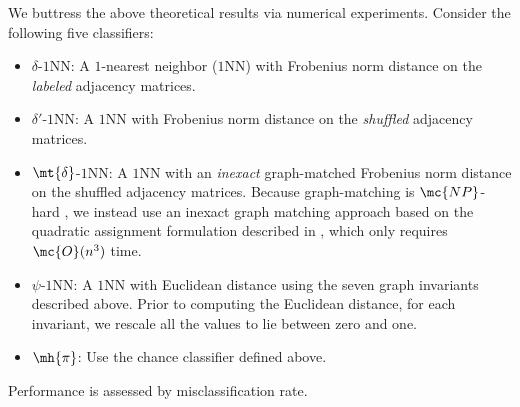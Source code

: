 \documentclass[10pt,journal,cspaper,compsoc]{IEEEtran}
\begin{document}
We buttress the above theoretical results via numerical experiments.  Consider the following five classifiers:
\begin{itemize}
	\item {$\delta$-$1$NN:}  A $1$-nearest neighbor ($1$NN) with Frobenius norm distance on the \emph{labeled} adjacency matrices.
	\item {$\delta'$-$1$NN:} A $1$NN with Frobenius norm distance on the \emph{shuffled} adjacency matrices.
	\item {$\mt{\delta}$-$1$NN:} A $1$NN with an \emph{inexact} graph-matched Frobenius norm distance on the shuffled adjacency matrices.  Because graph-matching is $\mc{NP}$-hard \cite{Garey1979}, we instead use an inexact graph matching approach based on the quadratic assignment formulation described in \cite{VP11_QAP}, which only requires $\mc{O}(n^3)$ time.
	\item {$\psi$-$1$NN:} A $1$NN with Euclidean distance using the seven graph invariants described above.  Prior to computing the Euclidean distance, for each invariant, we rescale all the values to lie between zero and one.
	\item {$\mh{\pi}$:} Use the chance classifier defined above.
\end{itemize}
Performance is assessed by misclassification rate.


% 
% 
\end{document}
